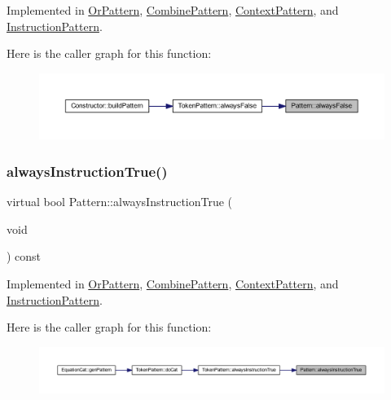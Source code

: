 Implemented in \mbox{\hyperlink{class_or_pattern_a8c30dc08477e285537c42e7246ec4d0e}{Or\+Pattern}}, \mbox{\hyperlink{class_combine_pattern_a48ba4c275b4c5fad7f06ca4fdd8ef0b5}{Combine\+Pattern}}, \mbox{\hyperlink{class_context_pattern_a61a99b63f09aed4e7a18933eba517b90}{Context\+Pattern}}, and \mbox{\hyperlink{class_instruction_pattern_a0b239a933cc9220adb175d602919986d}{Instruction\+Pattern}}.

Here is the caller graph for this function\+:
\nopagebreak
\begin{figure}[H]
\begin{center}
\leavevmode
\includegraphics[width=350pt]{class_pattern_ab7e66817fda44ad29954c8cfcb9c9266_icgraph}
\end{center}
\end{figure}
\mbox{\label{class_pattern_a62dd2f6b8bbb33279586739924ba4fa9}} 
\subsubsection{\texorpdfstring{alwaysInstructionTrue()}{alwaysInstructionTrue()}}
{\footnotesize\ttfamily virtual bool Pattern\+::always\+Instruction\+True (\begin{DoxyParamCaption}\item[{void}]{ }\end{DoxyParamCaption}) const\hspace{0.3cm}{\ttfamily [pure virtual]}}



Implemented in \mbox{\hyperlink{class_or_pattern_af5c30dcc861e051d0c741cf5989f657f}{Or\+Pattern}}, \mbox{\hyperlink{class_combine_pattern_a681d11a5cb768957162f4d8d647f0aa5}{Combine\+Pattern}}, \mbox{\hyperlink{class_context_pattern_addfef0aa6b03d6d6c3cce66bd64b903d}{Context\+Pattern}}, and \mbox{\hyperlink{class_instruction_pattern_a82ae35b557a32c6f208c6ff19967173b}{Instruction\+Pattern}}.

Here is the caller graph for this function\+:
\nopagebreak
\begin{figure}[H]
\begin{center}
\leavevmode
\includegraphics[width=350pt]{class_pattern_a62dd2f6b8bbb33279586739924ba4fa9_icgraph}
\end{center}
\end{figure}
\mbox{\label{class_pattern_ab1527189c63b797a70c23047c033d35f}} 
